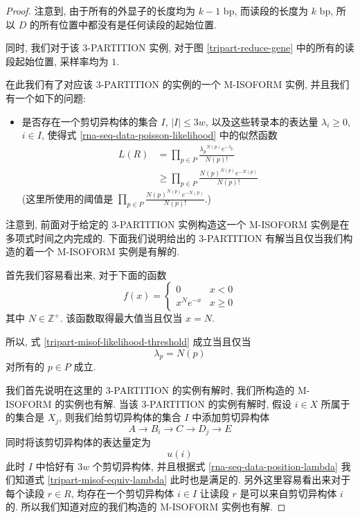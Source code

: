 \begin{proof}
注意到, 由于所有的外显子的长度均为 $k-1$ bp, 而读段的长度为 $k$ bp, 
所以 $D$ 的所有位置中都没有是任何读段的起始位置. 

同时, 我们对于该 3-PARTITION 实例, 
对于图 \ref{tripart-reduce-gene} 中的所有的读段起始位置, 采样率均为 $1$. 

在此我们有了对应该 3-PARTITION 的实例的一个 M-ISOFORM 实例, 并且我们有一个如下的问题: 
\begin{itemize}
\item 是否存在一个剪切异构体的集合 $I$, $|I| \leq 3w$, 
以及这些转录本的表达量 $\lambda_i \geq 0$, $i \in I$, 
使得式 \eqref{rna-seq-data-poisson-likelihood} 中的似然函数
\begin{align}
\label{tripart-misof-likelihood-threshold}
L(R) &= \prod_{p\in P} \frac{{\lambda_p}^{N(p)} e^{-\lambda_p}}{N(p)!} \nonumber \\
&\geq \prod_{p\in P} \frac{{N(p)}^{N(p)} e^{-N(p)}}{N(p)!}
\end{align}
(这里所使用的阈值是 $\prod_{p\in P} \frac{{N(p)}^{N(p)} e^{-N(p)}}{N(p)!}$.)
\end{itemize}

注意到, 前面对于给定的 3-PARTITION 实例构造这一个 M-ISOFORM 实例是在多项式时间之内完成的. 
下面我们说明给出的 3-PARTITION 有解当且仅当我们构造的着一个 M-ISOFORM 实例是有解的. 

首先我们容易看出来, 
对于下面的函数
\[
f(x) = \begin{cases}
0 & x < 0 \\
x^N e^{-x} & x \geq 0
\end{cases}
\]
其中 $N \in \mathbb{Z}^+$. 
该函数取得最大值当且仅当 $x=N$. 

所以, 式 \eqref{tripart-misof-likelihood-threshold} 成立当且仅当
\begin{equation}
\label{tripart-misof-equiv-lambda}
\lambda_p=N(p)
\end{equation}
对所有的 $p\in P$ 成立.  

我们首先说明在这里的 3-PARTITION 的实例有解时, 
我们所构造的 M-ISOFORM 的实例也有解. 
当该 3-PARTITION 的实例有解时, 假设 $i\in X$ 所属于的集合是 $X_j$, 
则我们给剪切异构体的集合 $I$ 中添加剪切异构体 
\[
A\to B_i \to C \to D_j \to E
\] 
同时将该剪切异构体的表达量定为 
\[
u(i)
\] 
此时 $I$ 中恰好有 $3w$ 个剪切异构体, 
并且根据式 \eqref{rna-seq-data-position-lambda} 我们知道式 
\eqref{tripart-misof-equiv-lambda} 此时也是满足的. 
另外这里容易看出来对于每个读段 $r\in R$, 
均存在一个剪切异构体 $i\in I$ 让读段 $r$ 是可以来自剪切异构体 $i$ 的.
所以我们知道对应的我们构造的 M-ISOFORM 实例也有解. 


\end{proof}
